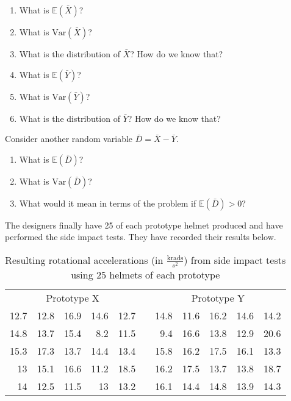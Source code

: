\documentclass[11pt]{article}\usepackage[]{graphicx}\usepackage[]{color}
\begin{document}
   \begin{enumerate}

      \item What is $\mathbb{E}(\bar{X})$?

      \item What is $\text{Var}(\bar{X})$?

      \item What is the distribution of $\bar{X}$? How do we know that?

      \item What is $\mathbb{E}(\bar{Y})$?

      \item What is $\text{Var}(\bar{Y})$?

      \item What is the distribution of $\bar{Y}$? How do we know that?
      
   \end{enumerate}

   Consider another random variable $\bar{D} = \bar{X} - \bar{Y}$.

   \begin{enumerate}[resume]

      \item What is $\mathbb{E}(\bar{D})$?

      \item What is $\text{Var}(\bar{D})$?

      \item What would it mean in terms of the problem if $\mathbb{E}(\bar{D}) > 0$?

   \end{enumerate}

   The designers finally have 25 of each prototype helmet produced and have performed the side impact tests. They have recorded their results below.



\begin{table}[h]
   \centering
   \caption{Resulting rotational accelerations (in $\frac{\text{krads}}{s^2}$) from side impact tests using 25 helmets of each prototype}
   \label{tab:label}
   \begin{tabular}{rrrrrcrrrrr}
      \multicolumn{5}{c}{Prototype X} & & \multicolumn{5}{c}{Prototype Y} \\ 
      \cline{1-5} \cline{7-11} 
   12.7 & 12.8 & 16.9 & 14.6 & 12.7 & & 14.8 & 11.6 & 16.2 & 14.6 & 14.2 \\ 
   14.8 & 13.7 & 15.4 & 8.2 & 11.5 & & 9.4 & 16.6 & 13.8 & 12.9 & 20.6 \\ 
   15.3 & 17.3 & 13.7 & 14.4 & 13.4 & & 15.8 & 16.2 & 17.5 & 16.1 & 13.3 \\ 
   13 & 15.1 & 16.6 & 11.2 & 18.5 & & 16.2 & 17.5 & 13.7 & 13.8 & 18.7 \\ 
   14 & 12.5 & 11.5 & 13 & 13.2 & & 16.1 & 14.4 & 14.8 & 13.9 & 14.3 \\ 
      \cline{1-5} \cline{7-11} 
   \end{tabular}
\end{table}
\end{document}
